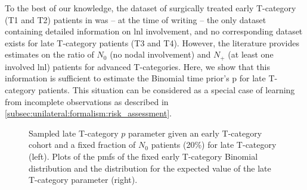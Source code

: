 \documentclass[\relativeRoot/main.tex]{subfiles}
\begin{document}
To the best of our knowledge, the dataset of surgically treated early T-category (T1 and T2) patients in \cite{sanguineti_defining_2009} was -- at the time of writing \cite{ludwig_hidden_2021} -- the only dataset containing detailed information on \gls{lnl} involvement, and no corresponding dataset exists for late T-category patients (T3 and T4). However, the literature provides estimates on the ratio of $N_0$ (no nodal involvement) and $N_+$ (at least one involved \gls{lnl}) patients for advanced T-categories. Here, we show that this information is sufficient to estimate the Binomial time prior's p for late T-category patients. This situation can be considered as a special case of learning from incomplete observations as described in \cref{subsec:unilateral:formalism:risk_assessment}.

\begin{figure}
    \centering
    \def\svgwidth{1.0\textwidth}
    
    \caption[Learned distribution over the late T-stage's binomial parameter]{Sampled late T-category $p$ parameter given an early T-category cohort and a fixed fraction of $N_0$ patients (20\%) for late T-category (left). Plots of the \glspl{pmf} of the fixed early T-category Binomial distribution and the distribution for the expected value of the late T-category parameter (right).}
    \label{fig:unilateral:simultaneous_learned}
\end{figure}
\end{document}
